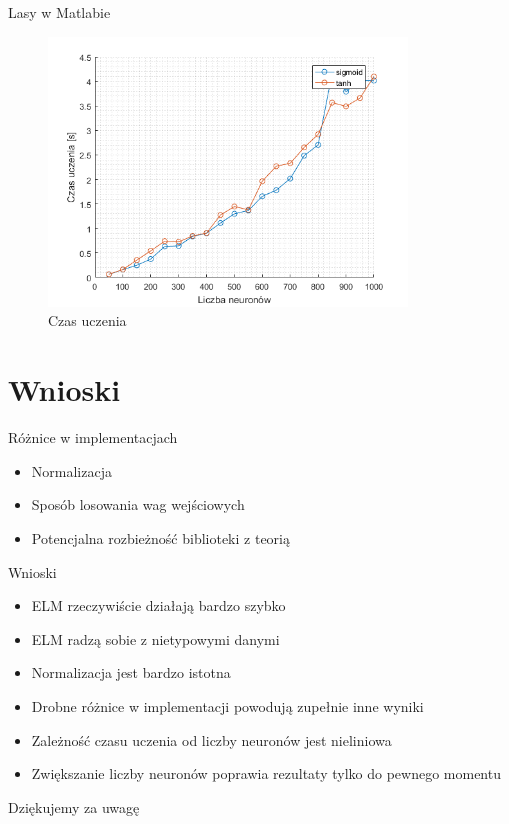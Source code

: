 \documentclass{beamer}
\begin{document}
\begin{frame}{Lasy w Matlabie}
\begin{figure}[H]
\centering
\includegraphics[width=0.85\textwidth]{forest_wydajnosc.png}
\caption{Czas uczenia}
\end{figure}
\end{frame}

\section{Wnioski}
\begin{frame}{Różnice w implementacjach}
\begin{itemize}
\item Normalizacja
\item Sposób losowania wag wejściowych
\item Potencjalna rozbieżność biblioteki z teorią
\end{itemize}
\end{frame}

\begin{frame}{Wnioski}
\begin{itemize}
\item ELM rzeczywiście działają bardzo szybko
\item ELM radzą sobie z nietypowymi danymi
\item Normalizacja jest bardzo istotna
\item Drobne różnice w implementacji powodują zupełnie inne wyniki
\item Zależność czasu uczenia od liczby neuronów jest nieliniowa
\item Zwiększanie liczby neuronów poprawia rezultaty tylko do pewnego momentu
\end{itemize}

\end{frame}

\begin{frame}
\begin{center}
\huge{Dziękujemy za uwagę}
\end{center}

\end{frame}
\end{document}
